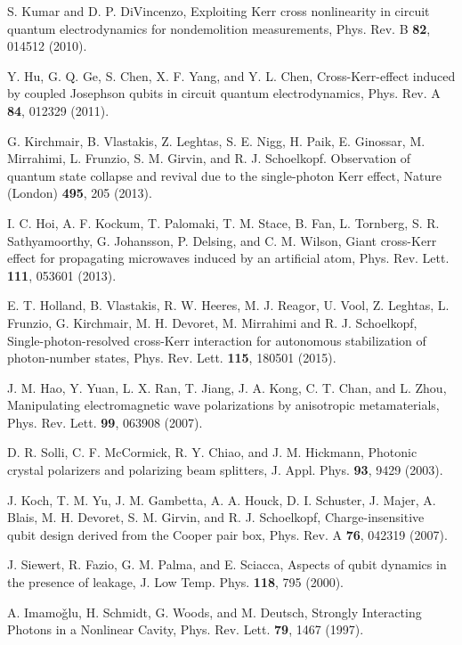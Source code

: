 \documentclass[showpacs,aps,graphicx,twocolumn]{revtex4}
\begin{document}
\begin{thebibliography}{1}
 S. Kumar and D. P. DiVincenzo,
Exploiting Kerr cross nonlinearity in circuit quantum electrodynamics
for nondemolition measurements, Phys. Rev. B \textbf{82}, 014512 (2010).


 Y. Hu, G. Q. Ge, S. Chen, X. F. Yang, and Y. L. Chen,
Cross-Kerr-effect induced by coupled Josephson qubits in circuit quantum electrodynamics,
Phys. Rev. A \textbf{84}, 012329 (2011).


 G. Kirchmair, B. Vlastakis, Z. Leghtas,
S. E. Nigg, H. Paik, E. Ginossar, M. Mirrahimi, L. Frunzio, S. M.
Girvin, and R. J. Schoelkopf. Observation of quantum state collapse
and revival due to the single-photon Kerr effect, Nature (London)
\textbf{495}, 205 (2013).


 I. C. Hoi, A. F. Kockum, T. Palomaki, T. M. Stace,
B. Fan, L. Tornberg, S. R. Sathyamoorthy, G. Johansson, P. Delsing,
and C. M. Wilson, Giant cross-Kerr effect for propagating microwaves
induced by an artificial atom, Phys. Rev. Lett. \textbf{111}, 053601 (2013).


 E. T. Holland, B. Vlastakis, R. W. Heeres,
M. J. Reagor, U. Vool, Z. Leghtas, L. Frunzio, G. Kirchmair,
M. H. Devoret, M. Mirrahimi and R. J. Schoelkopf,
Single-photon-resolved cross-Kerr interaction for
autonomous stabilization of photon-number states, Phys. Rev. Lett. \textbf{115}, 180501 (2015).




 J. M. Hao, Y. Yuan, L. X. Ran, T. Jiang,
J. A. Kong, C. T. Chan, and L. Zhou, Manipulating electromagnetic wave
polarizations by anisotropic metamaterials, Phys. Rev. Lett. \textbf{99}, 063908 (2007).


 D. R. Solli, C. F. McCormick, R. Y. Chiao,
and J. M. Hickmann, Photonic crystal polarizers and polarizing beam splitters,
J. Appl. Phys. \textbf{93}, 9429 (2003).


 J. Koch, T. M. Yu, J. M. Gambetta, A. A. Houck,
D. I. Schuster, J. Majer, A. Blais, M. H. Devoret, S. M. Girvin,
and R. J. Schoelkopf, Charge-insensitive qubit design derived
from the Cooper pair box, Phys. Rev. A \textbf{76}, 042319 (2007).


 J. Siewert, R. Fazio, G. M. Palma,
and E. Sciacca, Aspects of qubit dynamics in the presence of leakage,
J. Low Temp. Phys. \textbf{118}, 795 (2000).


 A. Imamo\v{g}lu, H. Schmidt, G. Woods,
and M. Deutsch, Strongly Interacting Photons in a Nonlinear Cavity,
Phys. Rev. Lett. \textbf{79}, 1467 (1997).



\end{thebibliography}
\end{document}

